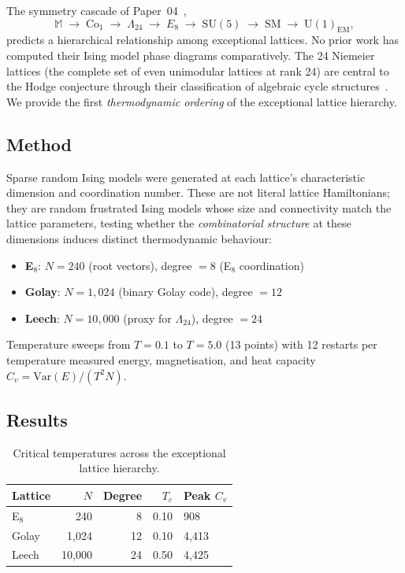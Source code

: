 \documentclass[11pt,a4paper]{article}
\begin{document}
The symmetry cascade of Paper~04~\cite{omega24},
\[
\mathbb{M} \;\to\; \mathrm{Co}_1 \;\to\; \Lambda_{24} \;\to\; E_8 \;\to\; \mathrm{SU}(5) \;\to\; \mathrm{SM} \;\to\; \mathrm{U}(1)_{\mathrm{EM}},
\]
predicts a hierarchical relationship among exceptional lattices.
No prior work has computed their Ising model phase diagrams comparatively.
The 24 Niemeier lattices (the complete set of even unimodular lattices at rank 24) are central to the Hodge conjecture through their classification of algebraic cycle structures~\cite{u24_hodge}.
We provide the first \emph{thermodynamic ordering} of the exceptional lattice hierarchy.

\subsection{Method}

Sparse random Ising models were generated at each lattice's characteristic dimension and coordination number.
These are not literal lattice Hamiltonians; they are random frustrated Ising models whose size and connectivity match the lattice parameters, testing whether the \emph{combinatorial structure} at these dimensions induces distinct thermodynamic behaviour:
\begin{itemize}[nosep]
\item \textbf{E$_8$}: $N = 240$ (root vectors), degree $= 8$ (E$_8$ coordination)
\item \textbf{Golay}: $N = 1{,}024$ (binary Golay code), degree $= 12$
\item \textbf{Leech}: $N = 10{,}000$ (proxy for $\Lambda_{24}$), degree $= 24$
\end{itemize}
Temperature sweeps from $T = 0.1$ to $T = 5.0$ (13 points) with 12 restarts per temperature measured energy, magnetisation, and heat capacity $C_v = \mathrm{Var}(E)/(T^2 N)$.

\subsection{Results}

\begin{table}[H]
\centering
\caption{Critical temperatures across the exceptional lattice hierarchy.}
\label{tab:leech}
\begin{tabular}{lrrrl}
\toprule
\textbf{Lattice} & \textbf{$N$} & \textbf{Degree} & \textbf{$T_c$} & \textbf{Peak $C_v$}\\
\midrule
E$_8$ & 240 & 8 & 0.10 & 908\\
Golay & 1{,}024 & 12 & 0.10 & 4{,}413\\
Leech & 10{,}000 & 24 & 0.50 & 4{,}425\\
\bottomrule
\end{tabular}
\end{table}
\end{document}
